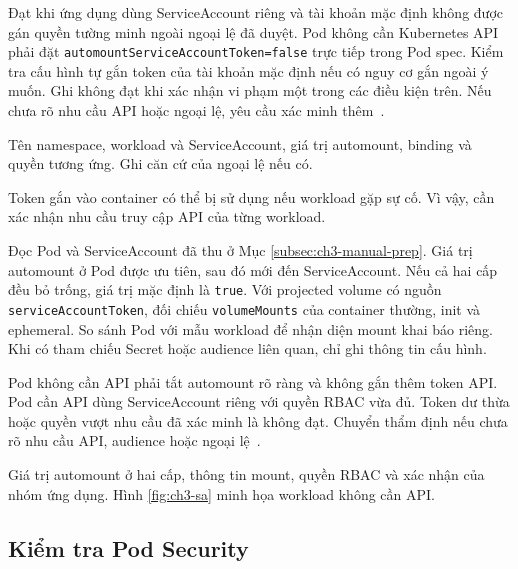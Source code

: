 Đạt khi ứng dụng dùng ServiceAccount riêng và tài khoản mặc định không được gán quyền tường minh ngoài ngoại lệ đã duyệt. Pod không cần Kubernetes API phải đặt \texttt{automountServiceAccountToken=false} trực tiếp trong Pod spec. Kiểm tra cấu hình tự gắn token của tài khoản mặc định nếu có nguy cơ gắn ngoài ý muốn. Ghi không đạt khi xác nhận vi phạm một trong các điều kiện trên. Nếu chưa rõ nhu cầu API hoặc ngoại lệ, yêu cầu xác minh thêm~\mbox{\parencites[tr.~40--41]{cis-gke-standard-v2}[tr.~26--27]{cis-gke-autopilot-v2}}.

Tên namespace, workload và ServiceAccount, giá trị automount, binding và quyền tương ứng. Ghi căn cứ của ngoại lệ nếu có.

Token gắn vào container có thể bị sử dụng nếu workload gặp sự cố. Vì vậy, cần xác nhận nhu cầu truy cập API của từng workload.

Đọc Pod và ServiceAccount đã thu ở Mục \ref{subsec:ch3-manual-prep}. Giá trị automount ở Pod được ưu tiên, sau đó mới đến ServiceAccount. Nếu cả hai cấp đều bỏ trống, giá trị mặc định là \texttt{true}. Với projected volume có nguồn \texttt{serviceAccountToken}, đối chiếu \texttt{volumeMounts} của container thường, init và ephemeral. So sánh Pod với mẫu workload để nhận diện mount khai báo riêng. Khi có tham chiếu Secret hoặc audience liên quan, chỉ ghi thông tin cấu hình.

Pod không cần API phải tắt automount rõ ràng và không gắn thêm token API. Pod cần API dùng ServiceAccount riêng với quyền RBAC vừa đủ. Token dư thừa hoặc quyền vượt nhu cầu đã xác minh là không đạt. Chuyển thẩm định nếu chưa rõ nhu cầu API, audience hoặc ngoại lệ~\mbox{\parencites[tr.~43--44]{cis-gke-standard-v2}[tr.~29--30]{cis-gke-autopilot-v2}}.

Giá trị automount ở hai cấp, thông tin mount, quyền RBAC và xác nhận của nhóm ứng dụng. Hình \ref{fig:ch3-sa} minh họa workload không cần API.


\subsection{Kiểm tra Pod Security}

